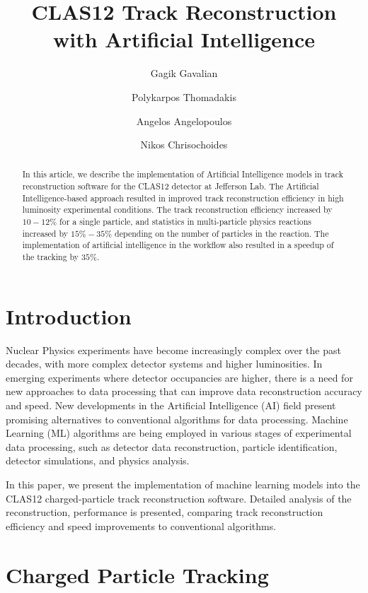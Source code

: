 \documentclass[aps,prl,preprint,12pt]{elsarticle}
\title{CLAS12 Track Reconstruction with Artificial Intelligence}
\author[1]{Gagik Gavalian}
\author[2]{Polykarpos Thomadakis}
\author[2]{Angelos Angelopoulos}
\author[2]{Nikos Chrisochoides}
\begin{document}
\begin{abstract}
  In this article, we describe the implementation of Artificial Intelligence models in track reconstruction
  software for the CLAS12 detector at Jefferson Lab. The Artificial Intelligence-based approach resulted 
  in improved track reconstruction efficiency in high luminosity experimental conditions.  The track
 reconstruction efficiency increased by $10-12\%$ for a single particle, and statistics in multi-particle physics 
 reactions increased by $15\%-35\%$ depending on the number of particles in the reaction. The implementation 
 of artificial intelligence in the workflow also resulted in a speedup of the tracking by $35\%$. 

\end{abstract}

\maketitle


\section{Introduction}
\indent

Nuclear Physics experiments have become increasingly complex over the past decades, with more complex detector systems and higher luminosities. In emerging experiments where detector occupancies are higher, there is a need for new approaches to data processing that can improve data reconstruction accuracy and speed. New developments in the Artificial Intelligence (AI) field present promising alternatives to conventional algorithms for data processing. Machine Learning (ML) algorithms are being employed in various stages of experimental data processing, such as detector data reconstruction, particle identification, detector simulations, and physics analysis. 

In this paper, we present the implementation of machine learning models into the CLAS12 charged-particle track reconstruction software. Detailed analysis 
of the reconstruction, performance is presented, comparing track reconstruction efficiency and speed improvements to conventional algorithms.

\section{Charged Particle Tracking}
\end{document}
